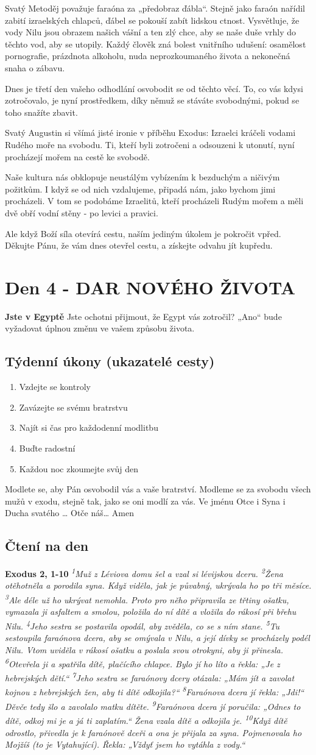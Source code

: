 \documentclass[11pt]{article}
\newcommand{\zacatekPrvniTyden}{
  \textbf{Jste v Egyptě} \newline
  Jste ochotni přijmout, že Egypt vás zotročil? „Ano“ bude vyžadovat úplnou změnu ve vašem způsobu života.

\subsection*{Týdenní úkony (ukazatelé cesty)}
\begin{enumerate}
  \item Vzdejte se kontroly
  \item Zavázejte se svému bratrstvu
  \item Najít si čas pro každodenní modlitbu
  \item Buďte radostní
  \item Každou noc zkoumejte svůj den
\end{enumerate}
Modlete se, aby Pán osvobodil vás a vaše bratrství. \newline
Modleme se za svobodu všech mužů v exodu, stejně tak, jako se oni modlí za vás.\newline
Ve jménu Otce i Syna i Ducha svatého …  Otče náš… Amen
}
\begin{document}
Svatý Metoděj považuje faraóna za „předobraz ďábla“. Stejně jako faraón nařídil zabití izraelských chlapců, ďábel se pokouší zabít lidskou ctnost. Vysvětluje, že vody Nilu jsou obrazem našich vášní a ten zlý chce, aby se naše duše vrhly do těchto vod, aby se utopily. Každý člověk zná bolest vnitřního udušení: osamělost pornografie, prázdnota alkoholu, nuda neprozkoumaného života a nekonečná snaha o zábavu.

Dnes je třetí den vašeho odhodlání osvobodit se od těchto věcí. To, co vás kdysi zotročovalo, je nyní prostředkem, díky němuž se stáváte svobodnými, pokud se toho snažíte zbavit.

Svatý Augustin si všímá jisté ironie v příběhu Exodus: Izraelci kráčeli vodami Rudého moře na svobodu. Ti, kteří byli zotročeni a odsouzeni k utonutí, nyní procházejí mořem na cestě ke svobodě.

Naše kultura nás obklopuje neustálým vybízením k bezduchým a ničivým požitkům. I když se od nich vzdalujeme, připadá nám, jako bychom jimi procházeli. V tom se podobáme Izraelitů, kteří procházeli Rudým mořem a měli dvě obří vodní stěny - po levici a pravici.

Ale když Boží síla otevírá cestu, naším jediným úkolem je pokročit vpřed.
Děkujte Pánu, že vám dnes otevřel cestu, a získejte odvahu jít kupředu.


\newpage
\section{Den 4 - DAR NOVÉHO ŽIVOTA}
\zacatekPrvniTyden
\subsection*{Čtení na den}
\textbf{Exodus 2, 1-10}
\newline
\textit{
\textsuperscript{1}Muž z Léviova domu šel a vzal si lévijskou dceru.
\textsuperscript{2}Žena otěhotněla a porodila syna. Když viděla, jak je půvabný, ukrývala ho po tři měsíce.
\textsuperscript{3}Ale déle už ho ukrývat nemohla. Proto pro něho připravila ze třtiny ošatku, vymazala ji asfaltem a smolou, položila do ní dítě a vložila do rákosí při břehu Nilu.
\textsuperscript{4}Jeho sestra se postavila opodál, aby zvěděla, co se s ním stane.
\textsuperscript{5}Tu sestoupila faraónova dcera, aby se omývala v Nilu, a její dívky se procházely podél Nilu. Vtom uviděla v rákosí ošatku a poslala svou otrokyni, aby ji přinesla.
\textsuperscript{6}Otevřela ji a spatřila dítě, plačícího chlapce. Bylo jí ho líto a řekla: „Je z hebrejských dětí.“
\textsuperscript{7}Jeho sestra se faraónovy dcery otázala: „Mám jít a zavolat kojnou z hebrejských žen, aby ti dítě odkojila?“
\textsuperscript{8}Faraónova dcera jí řekla: „Jdi!“ Děvče tedy šlo a zavolalo matku dítěte.
\textsuperscript{9}Faraónova dcera jí poručila: „Odnes to dítě, odkoj mi je a já ti zaplatím.“ Žena vzala dítě a odkojila je.
\textsuperscript{10}Když dítě odrostlo, přivedla je k faraónově dceři a ona je přijala za syna. Pojmenovala ho Mojžíš (to je Vytahující). Řekla: „Vždyť jsem ho vytáhla z vody.“}
\end{document}
